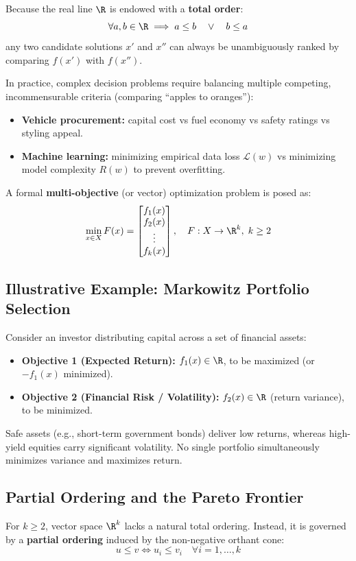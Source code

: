 Because the real line $\R$ is endowed with a \textbf{total order}:
\begin{equation}
\forall a, b \in \R \implies a \le b \quad \lor \quad b \le a
\end{equation}
any two candidate solutions $x'$ and $x''$ can always be unambiguously ranked by comparing $f(x')$ with $f(x'')$.

In practice, complex decision problems require balancing multiple competing, incommensurable criteria (comparing ``apples to oranges''):
\begin{itemize}
    \item \textbf{Vehicle procurement:} capital cost vs fuel economy vs safety ratings vs styling appeal.
    \item \textbf{Machine learning:} minimizing empirical data loss $\mathcal{L}(w)$ vs minimizing model complexity $R(w)$ to prevent overfitting.
\end{itemize}

A formal \textbf{multi-objective} (or vector) optimization problem is posed as:
\begin{equation}
\min_{x \in X} F(x) = \begin{bmatrix} f_1(x) \\ f_2(x) \\ \vdots \\ f_k(x) \end{bmatrix}, \quad F: X \to \R^k, \; k \ge 2
\end{equation}

\subsection{Illustrative Example: Markowitz Portfolio Selection}
Consider an investor distributing capital across a set of financial assets:
\begin{itemize}
    \item \textbf{Objective 1 (Expected Return):} $f_1(x) \in \R$, to be maximized (or $-f_1(x)$ minimized).
    \item \textbf{Objective 2 (Financial Risk / Volatility):} $f_2(x) \in \R$ (return variance), to be minimized.
\end{itemize}
Safe assets (e.g., short-term government bonds) deliver low returns, whereas high-yield equities carry significant volatility. No single portfolio simultaneously minimizes variance and maximizes return.

\subsection{Partial Ordering and the Pareto Frontier}
For $k \ge 2$, vector space $\R^k$ lacks a natural total ordering. Instead, it is governed by a \textbf{partial ordering} induced by the non-negative orthant cone:
\begin{equation}
u \le v \iff u_i \le v_i \quad \forall i = 1, \dots, k
\end{equation}

